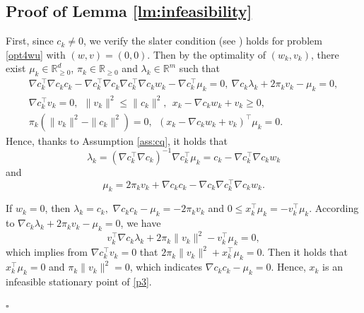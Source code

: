 \documentclass[11pt]{article}
\newenvironment{proof}{{\noindent\it Proof.}\quad}{\hfill $\square$\par}
\newcommand{\R}{\mathbb{R}}
\newcommand{\be}{\begin{equation}}
\newcommand{\ee}{\end{equation}}
\begin{document}
\subsection{Proof of Lemma \ref{lm:infeasibility}}\label{proof:lm3}
\begin{proof}
    First, {since \(c_k \neq 0\), we verify the slater condition (see \cite[section 5.2.3]{boyd2004convex}) holds for problem \eqref{opt4wu} with \((w,v) = (0,0)\).}
    Then by the optimality of $(w_k,v_k)$, there exist \(\mu_k \in \R^d_{\ge 0}\), {\(\pi_k \in \R_{\ge 0}\)} and \(\lambda_k \in \R^m\) such that
    \be\begin{aligned}\label{kkt-opt4wu}
        \nabla c_k^\top \nabla c_k c_k - \nabla c_k^\top \nabla c_k \nabla c_k^\top \nabla c_k w_k - \nabla c_k^\top \mu_k = 0, ~ \nabla c_k \lambda_k + 2\pi_k v_k - \mu_k = 0,\\
        \nabla c_k^\top v_k = 0,~~\|v_k\|^2 \leq \|c_k\|^2,~~x_k - \nabla c_k w_k + v_k \geq 0,\\
        \pi_k (\|v_k\|^2 - \|c_k\|^2)=0,~~(x_k - \nabla c_k w_k + v_k)^\top \mu_k = 0.
    \end{aligned}\ee
    Hence, thanks to Assumption \ref{ass:cq}, it holds that
    \be\label{lam}
        \lambda_k = (\nabla c_k^\top \nabla c_k)^{-1} \nabla c_k^\top \mu_k = c_k - \nabla c_k^\top \nabla c_k w_k
    \ee
    and \[\mu_k = 2\pi_k v_k + \nabla c_k c_k - \nabla c_k \nabla c_k^\top \nabla c_k w_k.\] 
    
    If \(w_k = 0\), then  $\lambda_k=c_k,$ \(\nabla c_k c_k - \mu_k = -2\pi_k v_k\) and \(0 \leq x_k^\top \mu_k = -v_k^\top \mu_k\).
    According to \(\nabla c_k \lambda_k + 2\pi_k v_k - \mu_k = 0\), we have
    \[
    v_k^\top \nabla c_k \lambda_k + 2\pi_k \|v_k\|^2 - v_k^\top \mu_k = 0,
    \]
    which implies from $\nabla c_k^\top v_k=0$ that
    \(
    2\pi_k \|v_k\|^2 + x_k^\top \mu_k= 0.
    \)
    Then it holds that \(x_k^\top \mu_k = 0\) and $\pi_k\|v_k\|^2=0$, which indicates 
     \(\nabla c_k c_k - \mu_k = 0\). Hence,   \(x_k\) is an infeasible stationary point of  \eqref{p3}. 
    

\end{proof}
\end{document}
